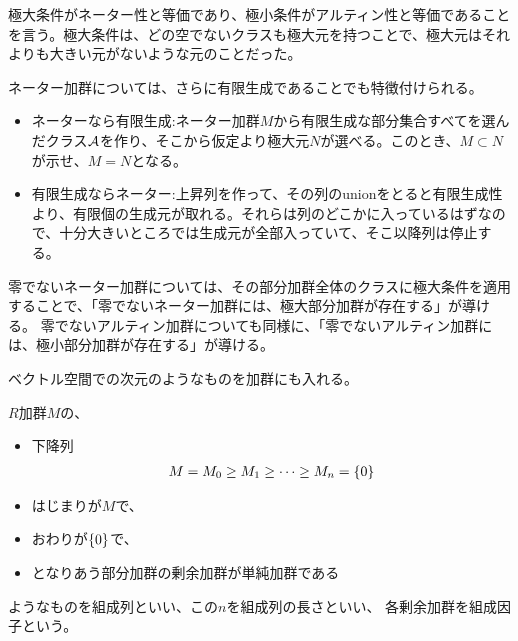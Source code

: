 \documentclass[9pt]{ltjsarticle}
\begin{document}
極大条件がネーター性と等価であり、極小条件がアルティン性と等価であることを言う。極大条件は、どの空でないクラスも極大元を持つことで、極大元はそれよりも大きい元がないような元のことだった。

ネーター加群については、さらに有限生成であることでも特徴付けられる。
\begin{myproof}
  \begin{itemize}
    \item ネーターなら有限生成:ネーター加群$M$から有限生成な部分集合すべてを選んだクラス$\cal A$を作り、そこから仮定より極大元$N$が選べる。このとき、$M\subset N$が示せ、$M=N$となる。
    \item 有限生成ならネーター:上昇列を作って、その列のunionをとると有限生成性より、有限個の生成元が取れる。それらは列のどこかに入っているはずなので、十分大きいところでは生成元が全部入っていて、そこ以降列は停止する。
  \end{itemize}
\end{myproof}


零でないネーター加群については、その部分加群全体のクラスに極大条件を適用することで、「零でないネーター加群には、極大部分加群が存在する」が導ける。
零でないアルティン加群についても同様に、「零でないアルティン加群には、極小部分加群が存在する」が導ける。

ベクトル空間での次元のようなものを加群にも入れる。

$R$加群$M$の、
\begin{itemize}
  \item 下降列
  \begin{align}
    M = M_0 \ge M_1 \ge \dots \ge M_n = \zeroset
  \end{align}
  \item はじまりが$M$で、
  \item おわりが$\zeroset$で、
  \item となりあう部分加群の剰余加群が単純加群である
\end{itemize}
ようなものを組成列といい、この$n$を組成列の長さといい、
各剰余加群を組成因子という。
\end{document}
